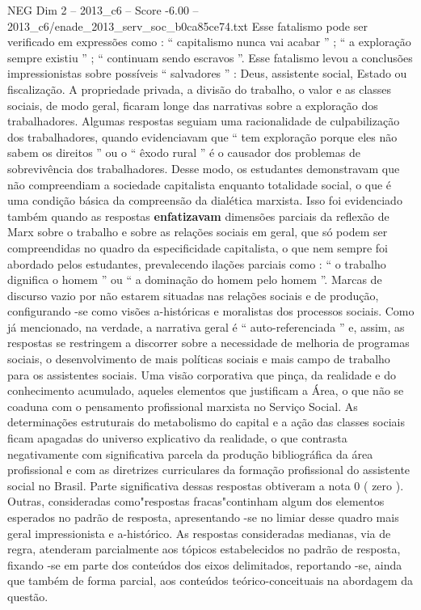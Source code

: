 \begin{textsample}{NEG Dim 2 – 2013\_c6 – Score -6.00 – 2013\_c6/enade\_2013\_serv\_soc\_b0ca85ce74.txt}
Esse fatalismo pode ser verificado em expressões como : “ capitalismo nunca vai acabar ” ; “ a exploração sempre existiu ” ; “ continuam sendo escravos ”.
Esse fatalismo levou a conclusões impressionistas sobre possíveis “ salvadores ” : Deus, assistente social, Estado ou fiscalização.
A propriedade privada, a divisão do trabalho, o valor e as classes sociais, de modo geral, ficaram longe das narrativas sobre a exploração dos trabalhadores.
Algumas respostas seguiam uma racionalidade de culpabilização dos trabalhadores, quando evidenciavam que “ tem exploração porque eles não sabem os direitos ” ou o “ êxodo rural ” é o causador dos problemas de sobrevivência dos trabalhadores.
Desse modo, os estudantes demonstravam que não compreendiam a sociedade capitalista enquanto totalidade social, o que é uma condição básica da compreensão da dialética marxista.
Isso foi evidenciado também quando as respostas \textbf{enfatizavam} dimensões parciais da reflexão de Marx sobre o trabalho e sobre as relações sociais em geral, que só podem ser compreendidas no quadro da especificidade capitalista, o que nem sempre foi abordado pelos estudantes, prevalecendo ilações parciais como : “ o trabalho dignifica o homem ” ou “ a dominação do homem pelo homem ”.
Marcas de discurso vazio por não estarem situadas nas relações sociais e de produção, configurando -se como visões a-históricas e moralistas dos processos sociais.
Como já mencionado, na verdade, a narrativa geral é “ auto-referenciada ” e, assim, as respostas se restringem a discorrer sobre a necessidade de melhoria de programas sociais, o desenvolvimento de mais políticas sociais e mais campo de trabalho para os assistentes sociais.
Uma visão corporativa que pinça, da realidade e do conhecimento acumulado, aqueles elementos que justificam a Área, o que não se coaduna com o pensamento profissional marxista no Serviço Social.
As determinações estruturais do metabolismo do capital e a ação das classes sociais ficam apagadas do universo explicativo da realidade, o que contrasta negativamente com significativa parcela da produção bibliográfica da área profissional e com as diretrizes curriculares da formação profissional do assistente social no Brasil.
Parte significativa dessas respostas obtiveram a nota 0 ( zero ).
Outras, consideradas como"respostas fracas"continham algum dos elementos esperados no padrão de resposta, apresentando -se no limiar desse quadro mais geral impressionista e a-histórico.
As respostas consideradas medianas, via de regra, atenderam parcialmente aos tópicos estabelecidos no padrão de resposta, fixando -se em parte dos conteúdos dos eixos delimitados, reportando -se, ainda que também de forma parcial, aos conteúdos teórico-conceituais na abordagem da questão.

\end{textsample}
